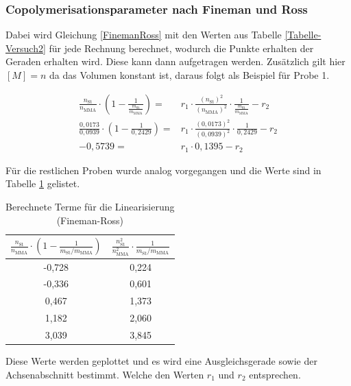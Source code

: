 \documentclass[10pt,a4paper,ngerman]{scrartcl}
\begin{document}
	\subsubsection{Copolymerisationsparameter nach Fineman und Ross}

		Dabei wird Gleichung \ref{FinemanRoss} mit den Werten aus Tabelle \ref{Tabelle-Versuch2} für jede Rechnung berechnet, wodurch die Punkte erhalten der Geraden erhalten wird. Diese kann dann aufgetragen werden.
		Zusätzlich gilt hier $[M] = n$ da das Volumen konstant ist, daraus folgt als Beispiel für Probe 1.

			\begin{eqnarray}
				\frac{n_\text{St}}{n_\text{MMA}} \cdot \left( 1- \frac{1}{\frac{{m_\text{St}}}{{m_\text{MMA}}}}\right) =& r_1 \cdot \frac{(n_\text{St})^2}{(n_\text{MMA})^2} \cdot \frac{1}{\frac{m_\text{St}}{m_\text{MMA}}} - r_2\\
				\frac{0,0173}{0,0939} \cdot \left( 1 - \frac{1}{0,2429} \right) =& r_1 \cdot \frac{(0,0173)^2}{(0,0939)^2} \cdot \frac{1}{0,2429} - r_2\\
				-0,5739 =& r_1 \cdot 0,1395 -r_2
			\end{eqnarray}
		
		Für die restlichen Proben wurde analog vorgegangen und die Werte sind in Tabelle \ref{Tabelle-Fineman} gelistet.
			
			\begin{table}[h]
				\centering
				\caption{Berechnete Terme für die Linearisierung (Fineman-Ross)}
				\label{Tabelle-Fineman}
				\begin{tabular}{cc}
					\toprule
					$\frac{n_{\text{St}}}{n_{\text{MMA}}} \cdot \left( 1 - \frac{1}{m_{\text{St}}/m_{\text{MMA}}} \right)$ & $\frac{n_{\text{St}}^2}{n_{\text{MMA}}^2} \cdot \frac{1}{m_{\text{St}}/m_{\text{MMA}}}$ \\ 
					\midrule
					-0,728 & 0,224 \\
					-0,336  & 0,601 \\
					0,467  & 1,373 \\
					1,182  & 2,060 \\
					3,039   & 3,845 \\
					\bottomrule
				\end{tabular}
			\end{table}

		Diese Werte werden geplottet und es wird eine Ausgleichsgerade sowie der Achsenabschnitt bestimmt.
		Welche den Werten $r_1$ und $r_2$ entsprechen.
\end{document}
